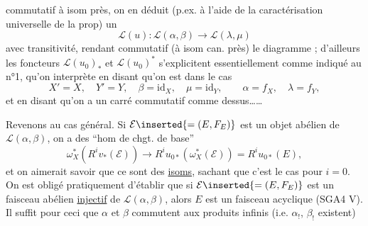 commutatif à isom près, on en déduit (p.ex. à l'aide de la caractérisation universelle de la prop) un  
\[
\mathcal L(u):\mathcal L(\alpha,\beta)\longrightarrow\mathcal L(\lambda,\mu)
\]
avec transitivité,\unsure{\ldots} rendant commutatif (à isom can. près) le diagramme
;
d'ailleurs les foncteurs $\mathcal L(u_0)_*$ et $\mathcal L(u_0)^*$ s'explicitent essentiellement comme indiqué au n°1, qu'on  interprète  en disant qu'on est dans le cas
\[
X'=X,\quad Y'=Y,\quad\beta=\mathrm{id}_X,\quad\mu=\mathrm{id}_Y,\qquad\alpha=f_X,\quad\lambda=f_Y,
\]
et en disant qu'on a un carré commutatif comme dessus\ldots\ldots

Revenons au cas général. Si $\mathcal E\inserted{=(E,F_E)}$ est un objet abélien de $\mathcal L(\alpha,\beta)$, on a des ``hom de chgt. de base''
\[
\omega_X^*(R^iv_*(\mathcal E))\longrightarrow R^iu_{0*}(\omega_X^*(\mathcal E))=R^iu_{0*}(E),
\]
et on aimerait savoir que ce sont des \uline{isoms}, sachant que c'est le cas pour $i=0$. On est obligé pratiquement d'établir que  si $\mathcal E\inserted{=(E,F_E)}$ est un faisceau abélien \uline{injectif} de $\mathcal L(\alpha,\beta)$, alors $E$ est un faisceau acyclique  (SGA4 V\quad). Il suffit pour ceci que $\alpha$ et $\beta$ commutent aux produits infinis (i.e. $\alpha_!$, $\beta_!$ existent)

